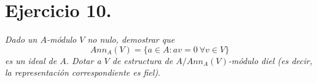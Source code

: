 \section{Ejercicio 10.} \emph{Dado un \(A\)-módulo \(V\) no nulo, demostrar que}
\[
  Ann_A(V) = \{a \in A : av = 0 \ \forall v \in V\}
\]
\emph{es un ideal de \(A\). Dotar a \(V\) de estructura de \(A/Ann_A(V)\)-módulo
  diel (es decir, la representación correspondiente es fiel)}.\\
